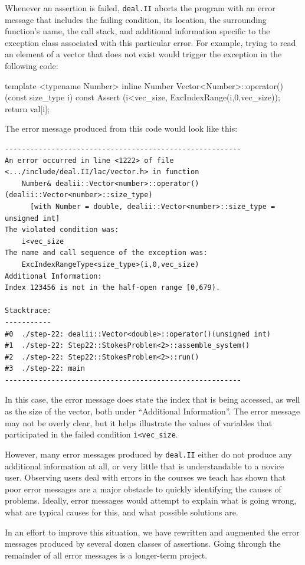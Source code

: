 \documentclass{ansarticle-preprint}
\newcommand{\specialword}[1]{\texttt{#1}}
\newcommand{\dealii}{{\specialword{deal.II}}}
\begin{document}
Whenever an assertion is failed, \dealii{} aborts the program with an error
message that includes the failing condition, its location, the surrounding
function's name, the call stack, and additional information specific to the
exception class associated with this particular error. For example, trying to
read an element of a vector that does not exist would trigger the exception in
the following code:
\begin{c++}
template <typename Number>
inline
Number Vector<Number>::operator() (const size_type i) const
{
  Assert (i<vec_size, ExcIndexRange(i,0,vec_size));
  return val[i];
}
\end{c++}
The error message produced from this code would look like this:
\begin{verbatim}
--------------------------------------------------------
An error occurred in line <1222> of file <.../include/deal.II/lac/vector.h> in function
    Number& dealii::Vector<number>::operator()(dealii::Vector<number>::size_type)
      [with Number = double, dealii::Vector<number>::size_type = unsigned int]
The violated condition was:
    i<vec_size
The name and call sequence of the exception was:
    ExcIndexRangeType<size_type>(i,0,vec_size)
Additional Information:
Index 123456 is not in the half-open range [0,679).

Stacktrace:
-----------
#0  ./step-22: dealii::Vector<double>::operator()(unsigned int)
#1  ./step-22: Step22::StokesProblem<2>::assemble_system()
#2  ./step-22: Step22::StokesProblem<2>::run()
#3  ./step-22: main
--------------------------------------------------------
\end{verbatim}

In this case, the error message does state the index that is being accessed,
as well as the size of the vector, both under ``Additional Information''. The
error message may not be overly clear, but it helps illustrate the values of
variables that participated in the failed condition \verb|i<vec_size|.

However, many error messages produced by \dealii{} either do not produce any
additional information at all, or very little that is understandable to a
novice user. Observing users deal with errors in the courses we teach has
shown that poor error messages are a major obstacle to quickly identifying the
causes of problems. Ideally, error messages would attempt to explain what is
going wrong, what are typical causes for this, and what possible solutions
are.

In an effort to improve this situation, we have rewritten and augmented the
error messages produced by several dozen classes of assertions. Going through
the remainder of all error messages is a longer-term project.
\end{document}
